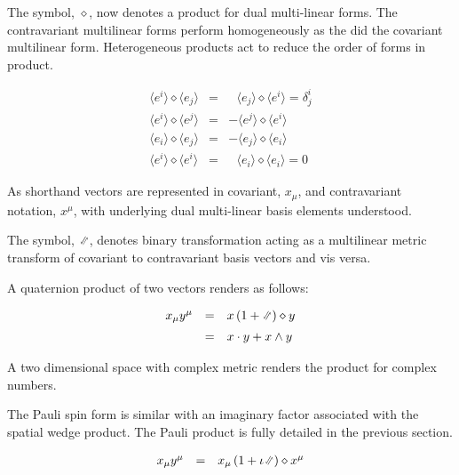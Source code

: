 \documentclass[aps,twocolumn,secnumarabic,nobalancelastpage,amsmath,amssymb,
amsthm,nofootinbib,parskip=full]{revtex4}
\numberwithin{equation}{section}
\newcommand{\iu}{\iota\mkern1mu}
\newcommand{\dualform}{\raisebox{1pt}{\scalebox{.8}
  {\rotatebox[origin=c]{60}{$\leftrightharpoons$}}}}
\newcommand{\pa}[1]{\left(#1\right)}
\begin{document}
The symbol, $\diamond$, now denotes a product for dual multi-linear
forms. The contravariant multilinear forms perform homogeneously as
the did the covariant multilinear form. Heterogeneous products act
to reduce the order of forms in product.

\begin{equation*}
\begin{array}{rcl}
\langle e^{i}\rangle\diamond\langle e_{j}\rangle&=&\hspace{8pt}
            \langle e_{j}\rangle\diamond\langle e^{i}\rangle=\delta^i_j \\[5pt]
\langle e^{i}\rangle\diamond\langle e^{j}\rangle&=&
                   -\langle e^{j}\rangle\diamond\langle e^{i}\rangle \\[5pt]
\langle e_{i}\rangle\diamond\langle e_{j}\rangle&=&
                   -\langle e_{j}\rangle\diamond\langle e_{i}\rangle \\[5pt]
\langle e^{i}\rangle\diamond\langle e^{i}\rangle&=&\hspace{8pt}
                    \langle e_{i}\rangle\diamond\langle e_{i}\rangle=0
\end{array}
\end{equation*}

As shorthand vectors are represented in covariant, $x_{\mu}$, and
contravariant notation, $x^\mu$, with underlying dual
multi-linear basis elements understood.

The symbol, $\dualform$, denotes binary transformation
acting as a multilinear metric transform of
covariant to contravariant basis vectors and vis versa.

A quaternion product of two vectors renders as follows:

\begin{equation*}
\begin{array}{rcl}
x_\mu y^\mu&=&x\pa{1+\dualform}\diamond y \\[5pt]
          &=&x\cdot y+x\wedge y
\end{array}
\end{equation*}

A two dimensional space with complex metric renders the product
for complex numbers.

The Pauli spin form is similar with an imaginary factor associated
with the spatial wedge product. The Pauli product is fully detailed
in the previous section.

\begin{equation*}
\begin{array}{rcl}
x_\mu y^\mu&=&x_\mu\pa{1+\iu\dualform}\diamond x^\mu
\end{array}
\end{equation*}
\end{document}
